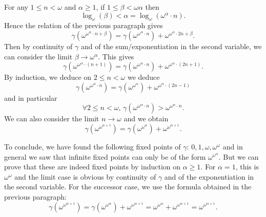For any \(1\leq n<\omega\) and \(\alpha \geq 1\),
if \(1\leq \beta < \omega\alpha\)
then
\begin{equation*}
\log_{\omega}(\beta) < \alpha = \log_{\omega}(\omega^{\alpha}\cdot n).
\end{equation*}
Hence the relation of the previous paragraph
gives
\begin{equation*}
\gamma(\omega^{{\omega^{\alpha}\cdot n} + \beta})
  = \gamma(\omega^{{\omega^{\alpha}\cdot n}}) + \omega^{{\omega^{\alpha}\cdot{2n}} + \beta}.
\end{equation*}
Then by continuity of \(\gamma\) and of the sum/exponentiation
in the second variable, we can consider the limit
\(\beta \rightarrow \omega^{\alpha}\).
This gives
\begin{equation*}
{\gamma(\omega^{\omega^{\alpha}\cdot(n + 1)})}
  ={\gamma(\omega^{\omega^{\alpha}\cdot n})} + \omega^{\omega^{\alpha}\cdot{(2n + 1)}}.
\end{equation*}
By induction, we deduce on \(2\leq n < \omega\) we deduce
\begin{equation*}
\gamma(\omega^{\omega^{\alpha}\cdot n})
  = \gamma(\omega^{\omega^{\alpha}}) + \omega^{\omega^{\alpha}\cdot{(2n-1)}}
\end{equation*}
and in particular
\begin{equation*}
\forall 2\leq n < \omega,\,
 \gamma(\omega^{\omega^{\alpha}\cdot n}) > \omega^{\omega^{\alpha}\cdot n}.
\end{equation*}
We can also consider the limit \(n \rightarrow \omega\) and we obtain
\begin{equation*}
{\gamma(\omega^{\omega^{\alpha + 1}})}
 = {\gamma(\omega^{\omega^{\alpha}})} + \omega^{\omega^{\alpha+1}}.
\end{equation*}


To conclude, we have found the following fixed points of
\(\gamma\): \(0, 1, \omega, \omega^\omega\)
and in general we saw that infinite fixed
points can only be of the form
\(\omega^{\omega^\alpha}\).
But we can prove
that these are indeed fixed points by induction on
\(\alpha \geq 1\).
For \(\alpha = 1\), this is \(\omega^\omega\) and the limit case is obvious by
continuity of \(\gamma\) and of the exponentiation in the second
variable. For the successor case, we use the formula obtained in the
previous paragraph:
\begin{equation*}
{\gamma(\omega^{\omega^{\alpha + 1}})}
  = {\gamma(\omega^{\omega^{\alpha}})} + \omega^{\omega^{\alpha + 1}}
  = \omega^{\omega^{\alpha}} + \omega^{\omega^{\alpha + 1}}
  =\omega^{\omega^{\alpha + 1}}.
\end{equation*}

